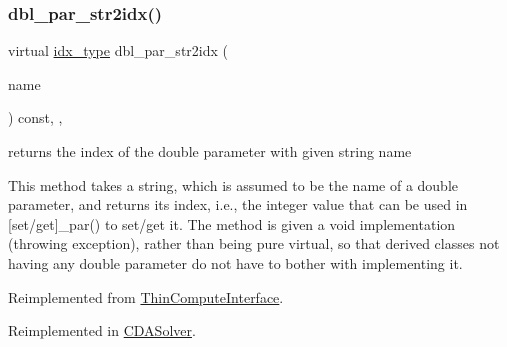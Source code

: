 \mbox{\label{class_s_m_spp__di__unipi__it_1_1_solver_a6d353ac3d1200d9bea89235da61bc4f3}} 
\subsubsection{\texorpdfstring{dbl\+\_\+par\+\_\+str2idx()}{dbl\_par\_str2idx()}}
{\footnotesize\ttfamily virtual \mbox{\hyperlink{class_s_m_spp__di__unipi__it_1_1_thin_compute_interface_aa3d710629ad8c434286726ad810c3b47}{idx\+\_\+type}} dbl\+\_\+par\+\_\+str2idx (\begin{DoxyParamCaption}\item[{const std\+::string \&}]{name }\end{DoxyParamCaption}) const\hspace{0.3cm}{\ttfamily [inline]}, {\ttfamily [override]}, {\ttfamily [virtual]}}



returns the index of the double parameter with given string name 

This method takes a string, which is assumed to be the name of a double parameter, and returns its index, i.\+e., the integer value that can be used in \mbox{[}set/get\mbox{]}\+\_\+par() to set/get it. The method is given a void implementation (throwing exception), rather than being pure virtual, so that derived classes not having any double parameter do not have to bother with implementing it. 

Reimplemented from \mbox{\hyperlink{class_s_m_spp__di__unipi__it_1_1_thin_compute_interface_a82f363814aa27e3243ba994a1ed5f39e}{Thin\+Compute\+Interface}}.



Reimplemented in \mbox{\hyperlink{class_s_m_spp__di__unipi__it_1_1_c_d_a_solver_a6d353ac3d1200d9bea89235da61bc4f3}{C\+D\+A\+Solver}}.

\mbox{\label{class_s_m_spp__di__unipi__it_1_1_solver_a118d563efb394530fe4b808bb3c1afbf}} 
